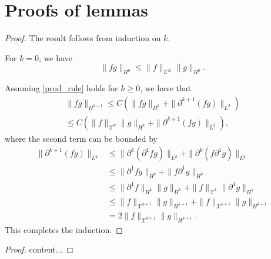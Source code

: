 \chapter{Proofs of lemmas}\label{lemma-appendix}
\prodruleone*
\begin{proof}
	The result follows from induction on \(k\).
	
	For \(k = 0\), we have
	\begin{equation}
		\| f g \|_{H^0} \leq \| f \|_{L^\infty} \| g\|_{H^0}.
	\end{equation}
	
	Assuming \cref{prod_rule} holds for \(k\geq 0\), we have that 
	\begin{align*}
		\| f g \|_{H^{k+1}} \leq C \left( \| f g \|_{H^k} + \| \partial^{k+1}(fg) \|_{L^2}\right) \\
		\leq C \left( \| f\|_{\mathcal X^k} \| g \|_{H^k} + \| \partial^{k+1}(fg) \|_{L^2} \right),
	\end{align*}
	where the second term can be bounded by 
	\begin{align*}
		\| \partial^{k+1}(fg) \|_{L^2} &\leq \| \partial^k(\partial^1 f g ) \|_{L^2} + \| \partial^k(f \partial^1 g) \|_{L^2} \\
		&\leq \| \partial^1 f  g \|_{H^k} + \| f \partial^1 g \|_{H^k} \\
		&\leq \| \partial^1 f \|_{H^k} \|g\|_{H^k} + \|f\|_{\mathcal X^k} \|\partial^1 g\|_{H^k} \\
		&\leq \| f \|_{\mathcal X^{k+1}} \| g\|_{H^{k+1}} + \|f \|_{\mathcal X^{k+1}} \|g\|_{H^{k+1}} \\
		&= 2  \| f \|_{\mathcal X^{k+1}} \| g\|_{H^{k+1}}.
	\end{align*}
	This completes the induction.
\end{proof}

\prodruletwo*
\begin{proof}
	content...
\end{proof}

